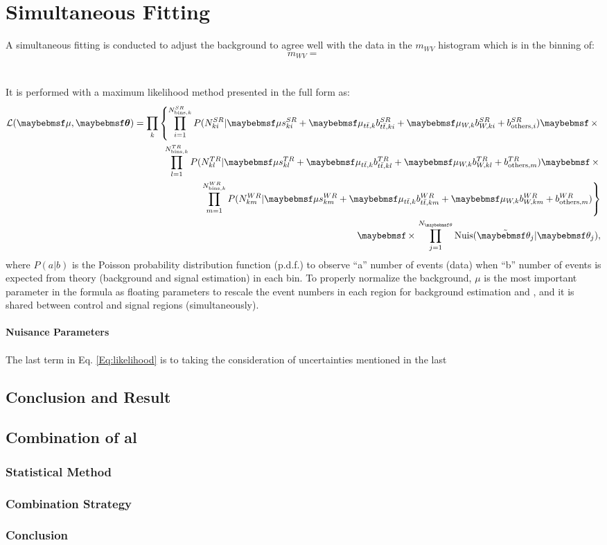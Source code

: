 \section{Simultaneous Fitting}
A simultaneous fitting is conducted to adjust the background to agree well with the data in the $m_{WV}$ histogram which is in the binning of:
\begin{equation}
m_{WV}={}
\end{equation}
\\
\\It is performed with a maximum likelihood method presented in the full form as:
 \begin{eqnarray}
 \mathcal{L}(\mu, \mbox{\boldmath $\theta$}) = \displaystyle\prod_{k} \left\{
 \displaystyle\prod_{i=1}^{N_{{\rm bins},k}^{SR}}P(N_{ki}^{SR}|\mu s_{ki}^{SR} + \mu_{t\bar{t},k} b_{t\bar{t},ki}^{SR} + \mu_{W,k} b_{W,ki}^{SR} + b_{{\rm others},i}^{SR})
 \times \right. \nonumber \\
 \displaystyle\prod_{l=1}^{N_{{\rm bins},k}^{TR}}P(N_{kl}^{TR}|\mu s_{kl}^{TR} + \mu_{t\bar{t},k} b_{t\bar{t},kl}^{TR} + \mu_{W,k} b_{W,kl}^{TR} + b_{{\rm others},m}^{TR})
 \times \nonumber \\
 \left. \displaystyle\prod_{m=1}^{N_{{\rm bins},k}^{WR}}P(N_{km}^{WR}|\mu s_{km}^{WR} + \mu_{t\bar{t},k} b_{t\bar{t},km}^{WR} + \mu_{W,k} b_{W,km}^{WR} + b_{{\rm others},m}^{WR})
 \right\} \nonumber \\
 \times\displaystyle\prod_{j=1}^{N_{\theta}}{\rm Nuis}(\tilde{\theta_j}|\theta_j),
 \label{Eq:likelihood}
 \end{eqnarray}
where $P(a|b)$ is the Poisson probability distribution function (p.d.f.) to observe ``a'' number of events (data) when ``b'' number of events is expected from theory (background and signal estimation) in each bin. To properly normalize the background, $\mu$ is the most important parameter in the formula as floating parameters to rescale the event numbers in each region for background estimation and , and it is shared between control and signal regions (simultaneously). 
\\
\\{\bf Nuisance Parameters}
\\
\\The last term in Eq. \ref{Eq:likelihood} is to taking the consideration of uncertainties mentioned in the last 

\subsection{Conclusion and Result}
\subsection{Combination of al}
\subsubsection{Statistical Method}
\subsubsection{Combination Strategy}
\subsubsection{Conclusion}